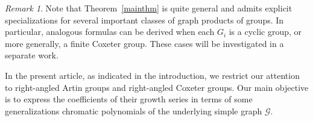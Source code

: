 \documentclass[11pt,reqno]{amsart}
\numberwithin{equation}{section} %
\theoremstyle{definition}
\theoremstyle{remark}
\newtheorem{rem}{Remark}
\numberwithin{equation}{section}
\begin{document}
\begin{rem}
Note that Theorem~\ref{mainthm} is quite general and admits explicit specializations for several important classes of graph products of groups. In particular, analogous formulas can be derived when each $G_i$ is a cyclic group, or more generally, a finite Coxeter group. These cases will be investigated in a separate work.

In the present article, as indicated in the introduction, we restrict our attention to right-angled Artin groups and right-angled Coxeter groups. Our main objective is to express the coefficients of their growth series in terms of some generalizations chromatic polynomials of the underlying simple graph $\mathcal{G}$.
\end{rem}

\end{document}
